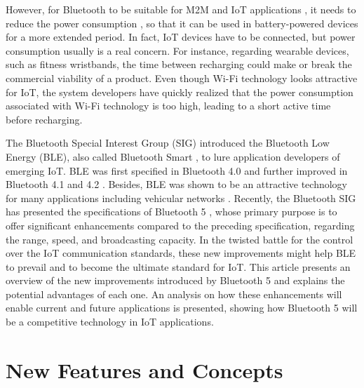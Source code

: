 \documentclass[12pt, draftclsnofoot, onecolumn]{IEEEtran}
\begin{document}
However, for Bluetooth to be suitable for M2M and IoT applications \cite{6963809}, it needs to reduce the power consumption \cite{s151024818}, so that it can be used in battery-powered devices for a more extended period. In fact, IoT devices have to be connected, but power consumption usually is a real concern. For instance, regarding wearable devices, such as fitness wristbands, the time between recharging could make or break the commercial viability of a product. Even though Wi-Fi technology looks attractive for IoT, the system developers have quickly realized that the power consumption associated with Wi-Fi technology is too high, leading to a short active time before recharging.


The Bluetooth Special Interest Group (SIG) introduced the Bluetooth Low Energy (BLE), also called Bluetooth Smart \cite{7347955}, to lure application developers of emerging IoT. BLE was first specified in Bluetooth 4.0 and further improved in Bluetooth 4.1 and 4.2 \cite{bt4all}. Besides, BLE was shown to be an attractive technology for many applications including vehicular networks \cite{7010544}. Recently, the Bluetooth SIG has presented the specifications of Bluetooth 5 \cite{bt5release}, whose primary purpose is to offer significant enhancements compared to the preceding specification, regarding the range, speed, and broadcasting capacity. In the twisted battle for the control over the IoT communication standards, these new improvements might help BLE to prevail and to become the ultimate standard for IoT. This article presents an overview of the new improvements introduced by Bluetooth 5 and explains the potential advantages of each one. An analysis on how these enhancements will enable current and future applications is presented, showing how Bluetooth 5 will be a competitive technology in IoT applications.

\section{New Features and Concepts}
\label{sec:newfeatures}
\end{document}
